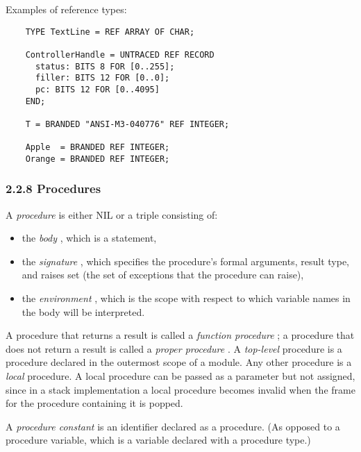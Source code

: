 \documentclass[10pt]{article}
\begin{document}
  Examples of reference types: 
\begin{verbatim}
    TYPE TextLine = REF ARRAY OF CHAR;

    ControllerHandle = UNTRACED REF RECORD
      status: BITS 8 FOR [0..255];
      filler: BITS 12 FOR [0..0];
      pc: BITS 12 FOR [0..4095]
    END;

    T = BRANDED "ANSI-M3-040776" REF INTEGER;

    Apple  = BRANDED REF INTEGER;
    Orange = BRANDED REF INTEGER;
\end{verbatim}



 
\subsubsection*{2.2.8 Procedures}


  A \emph{procedure}
 is either NIL or a triple consisting of: 
\begin{itemize}
\item  the \emph{body}
, which is a statement, 
\item  the \emph{signature}
, which specifies the procedure's formal arguments, result type, and raises set (the set of exceptions that the procedure can raise), 
\item  the \emph{environment}
, which is the scope with respect to which variable names in the body will be interpreted. 
\end{itemize}



 A procedure that returns a result is called a \emph{function procedure}
; a procedure that does not return a result is called a \emph{proper procedure}
. A \emph{top-level}
 procedure is a procedure declared in the outermost scope of a module. Any other procedure is a \emph{local}
 procedure. A local procedure can be passed as a parameter but not assigned, since in a stack implementation a local procedure becomes invalid when the frame for the procedure containing it is popped. 


 A \emph{procedure constant}
 is an identifier declared as a procedure. (As opposed to a procedure variable, which is a variable declared with a procedure type.) 
\end{document}
